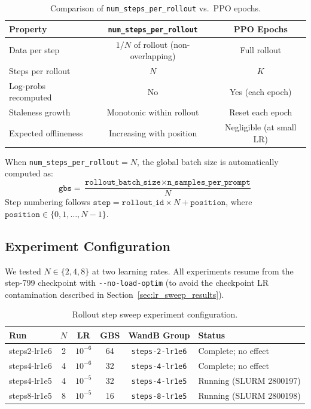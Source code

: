 \documentclass[11pt,a4paper]{article}
\begin{document}
\begin{table}[H]
\centering
\caption{Comparison of \texttt{num\_steps\_per\_rollout} vs.\ PPO epochs.}
\label{tab:steps_vs_epochs}
\begin{tabular}{@{}lcc@{}}
\toprule
\textbf{Property} & \texttt{num\_steps\_per\_rollout} & \textbf{PPO Epochs} \\
\midrule
Data per step       & $1/N$ of rollout (non-overlapping) & Full rollout \\
Steps per rollout   & $N$ & $K$ \\
Log-probs recomputed & No  & Yes (each epoch) \\
Staleness growth     & Monotonic within rollout & Reset each epoch \\
Expected offlineness & Increasing with position & Negligible (at small LR) \\
\bottomrule
\end{tabular}
\end{table}

When \texttt{num\_steps\_per\_rollout}${}= N$, the global batch size is
automatically computed as:
\[
  \texttt{gbs} = \frac{\texttt{rollout\_batch\_size} \times \texttt{n\_samples\_per\_prompt}}{N}
\]
Step numbering follows $\texttt{step} = \texttt{rollout\_id} \times N + \texttt{position}$,
where $\texttt{position} \in \{0, 1, \ldots, N{-}1\}$.

\subsection{Experiment Configuration}

We tested $N \in \{2, 4, 8\}$ at two learning rates. All experiments resume from
the step-799 checkpoint with \texttt{-{}-no-load-optim} (to avoid the checkpoint
LR contamination described in Section~\ref{sec:lr_sweep_results}).

\begin{table}[H]
\centering
\caption{Rollout step sweep experiment configuration.}
\label{tab:steps_sweep_config}
\begin{tabular}{@{}lccccl@{}}
\toprule
\textbf{Run} & $N$ & \textbf{LR} & \textbf{GBS} & \textbf{WandB Group} & \textbf{Status} \\
\midrule
steps2-lr1e6 & 2 & $10^{-6}$ & 64  & \texttt{steps-2-lr1e6}  & Complete; no effect \\
steps4-lr1e6 & 4 & $10^{-6}$ & 32  & \texttt{steps-4-lr1e6}  & Complete; no effect \\
steps4-lr1e5 & 4 & $10^{-5}$ & 32  & \texttt{steps-4-lr1e5}  & Running (SLURM 2800197) \\
steps8-lr1e5 & 8 & $10^{-5}$ & 16  & \texttt{steps-8-lr1e5}  & Running (SLURM 2800198) \\
\bottomrule
\end{tabular}
\end{table}
\end{document}
